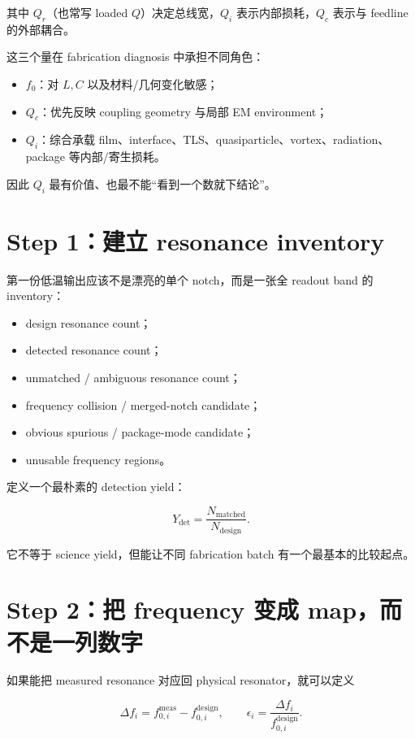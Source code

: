 其中 $Q_r$（也常写 loaded $Q$）决定总线宽，$Q_i$ 表示内部损耗，$Q_c$ 表示与 feedline 的外部耦合。

这三个量在 fabrication diagnosis 中承担不同角色：

\begin{itemize}
  \item $f_0$：对 $L,C$ 以及材料/几何变化敏感；
  \item $Q_c$：优先反映 coupling geometry 与局部 EM environment；
  \item $Q_i$：综合承载 film、interface、TLS、quasiparticle、vortex、radiation、package 等内部/寄生损耗。
\end{itemize}

因此 $Q_i$ 最有价值、也最不能“看到一个数就下结论”。

\section{Step 1：建立 resonance inventory}

第一份低温输出应该不是漂亮的单个 notch，而是一张全 readout band 的 inventory：

\begin{itemize}
  \item design resonance count；
  \item detected resonance count；
  \item unmatched / ambiguous resonance count；
  \item frequency collision / merged-notch candidate；
  \item obvious spurious / package-mode candidate；
  \item unusable frequency regions。
\end{itemize}

定义一个最朴素的 detection yield：

\[
Y_{\mathrm{det}}=\frac{N_{\mathrm{matched}}}{N_{\mathrm{design}}}.
\]

它不等于 science yield，但能让不同 fabrication batch 有一个最基本的比较起点。

\section{Step 2：把 frequency 变成 map，而不是一列数字}

如果能把 measured resonance 对应回 physical resonator，就可以定义

\[
\Delta f_i=f_{0,i}^{\mathrm{meas}}-f_{0,i}^{\mathrm{design}},
\qquad
\epsilon_i=\frac{\Delta f_i}{f_{0,i}^{\mathrm{design}}}.
\]


